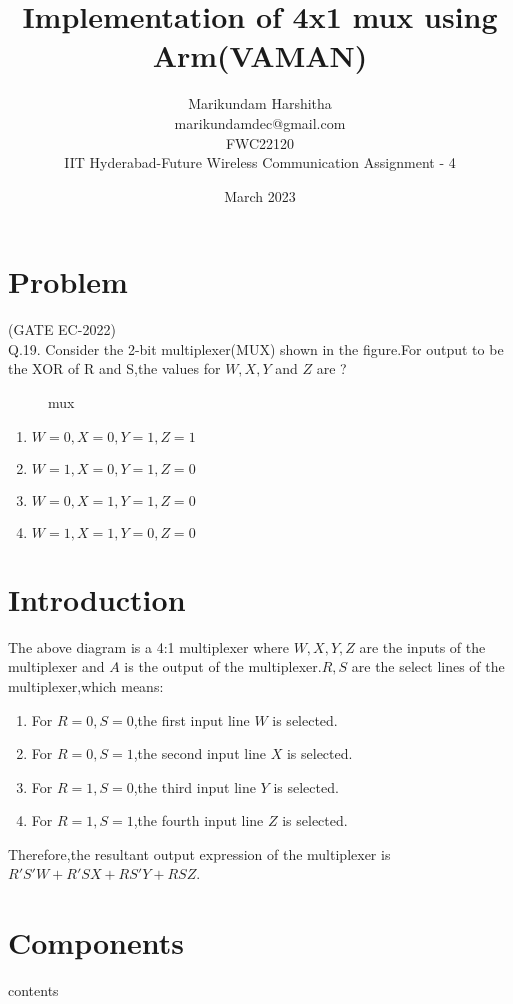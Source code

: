 \documentclass[12pt]{article}
\title{Implementation of 4x1 mux using Arm(VAMAN)}
\date{March 2023}
\author{Marikundam Harshitha\\marikundamdec@gmail.com\\FWC22120\\IIT Hyderabad-Future Wireless Communication Assignment - 4}
\begin{document}
\maketitle
\tableofcontents
\pagebreak

	 \section{Problem}
	 (GATE EC-2022)\\

Q.19. Consider the 2-bit multiplexer(MUX) shown in the figure.For output to be the XOR of R and S,the values for $ W,X,Y$ and $Z$ are ?\newline
\begin{figure}[h]

\caption{mux}
\label{fig:1}
\end{figure}
\begin{enumerate}
\item $W = 0, X = 0, Y = 1, Z = 1$
\item $W = 1, X = 0, Y = 1, Z = 0$
\item $W = 0, X = 1, Y = 1, Z = 0$
\item $W = 1, X = 1, Y = 0, Z = 0$
\end{enumerate}
\section{Introduction}
	The above diagram is a 4:1 multiplexer where $W, X, Y, Z$ are the inputs of the multiplexer and $A$ is the output of the multiplexer.$R , S$ are the select lines of the multiplexer,which means:\newline
\begin{enumerate}
\item For $R = 0,S = 0$,the first input line $W$ is selected.
\item For $R = 0,S = 1$,the second input line $X$ is selected.
\item For $R = 1,S = 0$,the third input line $Y$ is selected.
\item For $R = 1,S = 1$,the fourth input line $Z$ is selected.
\end{enumerate}
Therefore,the resultant output expression of the multiplexer is $R'S'W + R'SX + RS'Y + RSZ$.
\section{Components}
\begin{table}[h]
	
\caption{contents}
\label{table 1}
\end{table}
	\pagebreak
\end{document}
